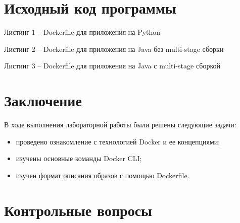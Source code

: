 \clearpage

\section*{Исходный код программы}


Листинг 1 -- Dockerfile для приложения на Python


Листинг 2 -- Dockerfile для приложения на Java без multi-stage сборки


Листинг 3 -- Dockerfile для приложения на Java с multi-stage сборкой

\section*{Заключение}

В ходе выполнения лабораторной работы были решены следующие задачи:
\begin{itemize}
	\item проведено ознакомление с технологией Docker и ее концепциями;
	\item изучены основные команды Docker CLI;
	\item изучен формат описания образов с помощью Dockerfile.
\end{itemize}

\section*{Контрольные вопросы}

